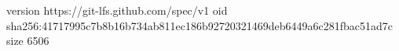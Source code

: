 version https://git-lfs.github.com/spec/v1
oid sha256:41717995c7b8b16b734ab811ec186b92720321469deb6449a6c281fbac51ad7c
size 6506
